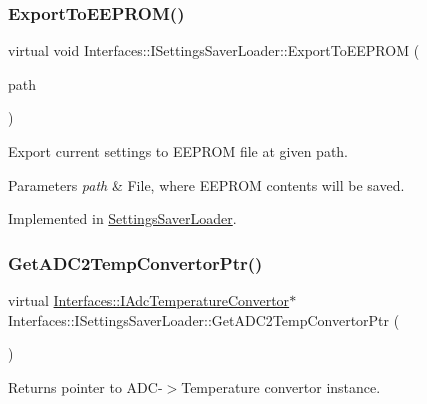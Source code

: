 \subsubsection{\texorpdfstring{Export\+To\+E\+E\+P\+R\+O\+M()}{ExportToEEPROM()}}
{\footnotesize\ttfamily virtual void Interfaces\+::\+I\+Settings\+Saver\+Loader\+::\+Export\+To\+E\+E\+P\+R\+OM (\begin{DoxyParamCaption}\item[{Q\+String}]{path }\end{DoxyParamCaption})\hspace{0.3cm}{\ttfamily [pure virtual]}}



Export current settings to E\+E\+P\+R\+OM file at given path. 


\begin{DoxyParams}{Parameters}
{\em path} & File, where E\+E\+P\+R\+OM contents will be saved. \\
\hline
\end{DoxyParams}


Implemented in \hyperlink{class_settings_saver_loader_a2a3e3c7f6f1f521b9423db4d63ddae74}{Settings\+Saver\+Loader}.

\mbox{\label{class_interfaces_1_1_i_settings_saver_loader_a44d68d2bc7de1717bc41ee264db13ac5}} 
\subsubsection{\texorpdfstring{Get\+A\+D\+C2\+Temp\+Convertor\+Ptr()}{GetADC2TempConvertorPtr()}}
{\footnotesize\ttfamily virtual \hyperlink{class_interfaces_1_1_i_adc_temperature_convertor}{Interfaces\+::\+I\+Adc\+Temperature\+Convertor}$\ast$ Interfaces\+::\+I\+Settings\+Saver\+Loader\+::\+Get\+A\+D\+C2\+Temp\+Convertor\+Ptr (\begin{DoxyParamCaption}{ }\end{DoxyParamCaption})\hspace{0.3cm}{\ttfamily [pure virtual]}}



Returns pointer to A\+D\+C-\/$>$Temperature convertor instance. 

